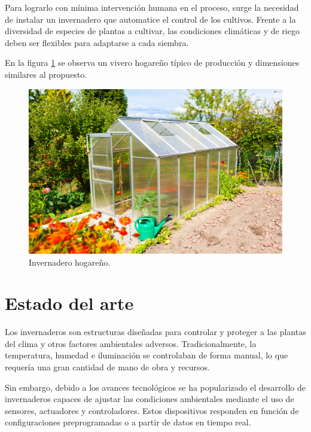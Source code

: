 Para lograrlo con mínima intervención humana en el proceso, surge la necesidad de instalar un invernadero que automatice el control de los cultivos. Frente a la diversidad de especies de plantas a cultivar, las condiciones climáticas y de riego deben ser flexibles para adaptarse a cada siembra. 


 
En la figura \ref{fig:imgInvernadero} se observa un vivero hogareño típico de producción y dimensiones similares al propuesto.




\begin{figure}[htpb]
\centering 
\includegraphics[width=.7\textwidth]{../Figures/invernadero1.jpg}
\caption[Invernadero hogareño]{Invernadero hogareño\protect\footnotemark.}
\label{fig:imgInvernadero}
\end{figure}






\section{Estado del arte}
\label{sec:Estado del arte}

Los invernaderos son estructuras diseñadas para controlar y proteger a las plantas del clima y otros factores ambientales adversos. Tradicionalmente, la temperatura, humedad e iluminación se controlaban de forma manual, lo que requería una gran cantidad de mano de obra y recursos. 

Sin embargo, debido a los avances tecnológicos se ha popularizado el desarrollo de invernaderos capaces de ajustar las condiciones ambientales mediante el uso de sensores, actuadores y controladores. Estos dispositivos responden en función de configuraciones preprogramadas o a partir de datos en tiempo real.  

